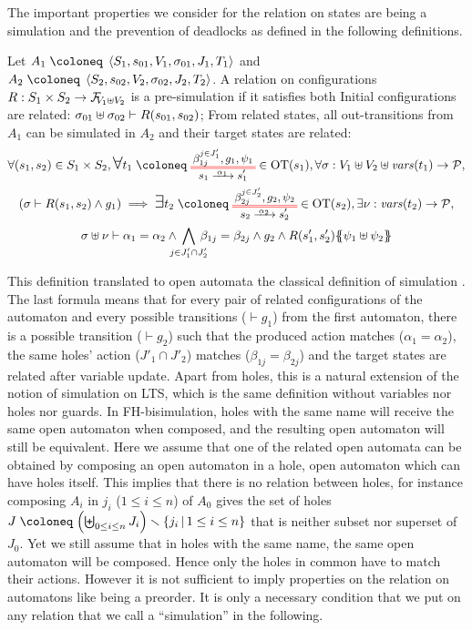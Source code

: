 \documentclass{article}
\begin{document}
The important properties we consider for the relation on states are being a simulation and the prevention of deadlocks as defined in the following definitions.
\begin{defi}
Let \(A_1 \defobject \OAg[1]\) and \(A_2 \defobject \OAg[2]\).
A relation on configurations \(R: S_1 \times S_2 \to \rformulas[V_1 \uplus V_2]\) is a pre-simulation if it satisfies both
 Initial configurations are related: \(\sigma_{01} \uplus \sigma_{02} \vdash R\mpar{s_{01}, s_{02}}\);
 From related states, all out-transitions from \(A_1\) can be simulated in \(A_2\) and their target states are related:
\begin{multline*}
	\forall \mpar{s_1, s_2} \in S_1 \times S_2, \bigsymb{\forall} t_1 \defobject \OTx{1}{}{1}{1} \in \fOT{s_1}, \forall \sigma: V_1 \uplus V_2 \uplus \fvars{t_1} \to \values, \\
	\mpar{\sigma \vdash R\mpar{s_1, s_2} \wedge g_1} \implies \bigsymb{\exists} t_2 \defobject \OTx{2}{}{2}{2} \in \fOT{s_2}, \exists \nu: \fvars{t_2} \to \values, \\
	\sigma \uplus \nu \vdash \alpha_1 = \alpha_2 \wedge \bigwedge_\subbox{j \in J'_1 \cap J'_2} \beta_{1j} = \beta_{2j} \wedge g_2 \wedge R\mpar{s'_1, s'_2}\psubst{\psi_1 \uplus \psi_2}
\end{multline*}
\end{defi}
This definition translated to open automata the classical definition of simulation \cite{10.1007/3-540-54430-5_78}.
The last formula means that for every pair of related configurations of the automaton and every possible transitions (\(\vdash g_1\)) from the first automaton, there is a possible transition (\(\vdash g_2\)) such that the produced action matches (\(\alpha_1 = \alpha_2\)), the same holes' action (\(J'_1 \cap J'_2\)) matches (\(\beta_{1j} = \beta_{2j}\)) and the target states are related after variable update. %
Apart from holes, this is a natural extension of the notion of simulation on LTS, which is the same definition without variables nor holes nor guards.
In FH-bisimulation, holes with the same name will receive the same open automaton when composed, and the resulting open automaton will still be equivalent.
Here we assume that one of the related open automata can be obtained by composing an open automaton in a hole, open automaton which can have holes itself.
This implies that there is no relation between  holes, for instance composing \(A_i\) in \(j_i\) (\(1 \leq i \leq n\)) of \(A_0\) gives the set of holes \(J \defobject \mpar{\biguplus_{0 \leq i \leq n} J_i} \setminus \mset{j_i}{1 \leq i \leq n}\) that is neither subset nor superset of \(J_0\).
Yet we still assume that in holes with the same name, the same open automaton will be composed.
Hence only the holes in common have to match their actions.
However it is not sufficient to imply properties on the relation on automatons like being a preorder.
It is only a necessary condition that we put on any relation that we call a ``simulation'' in the following.
\end{document}
